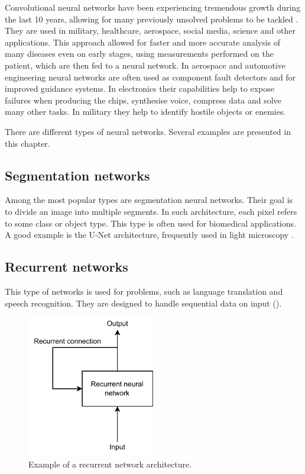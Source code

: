Convolutional neural networks have been experiencing tremendous growth during the last 10 years, allowing for many previously unsolved problems to be tackled \cite{li2021survey}. They are used in military, healthcare, aerospace, social media, science and other applications. This approach allowed for faster and more accurate analysis of many diseases even on early stages, using measurements performed on the patient, which are then fed to a neural network. In aerospace and automotive engineering neural networks are often used as component fault detectors and for improved guidance systems. In electronics their capabilities help to expose failures when producing the chips, synthesise voice, compress data and solve many other tasks. In military they help to identify hostile objects or enemies. 


There are different types of neural networks. Several examples are presented in this chapter.

\subsection{Segmentation networks}
Among the most popular types are segmentation neural networks. Their goal is to divide an image into multiple segments. In such architecture, each pixel refers to some class or object type. This type is often used for biomedical applications. A good example is the U-Net architecture, frequently used in light microscopy \cite{ronneberger2015u}.

\subsection{Recurrent networks}

This type of networks is used for problems, such as language translation and speech recognition. They are designed to handle sequential data on input ().

\begin{figure}[!h]
  \centering
  \includegraphics[width=0.5\textwidth]{./fig/photos/recurrent.pdf}

  \caption{Example of a recurrent network architecture.}
  \label{fig:recurrent}
\end{figure}


